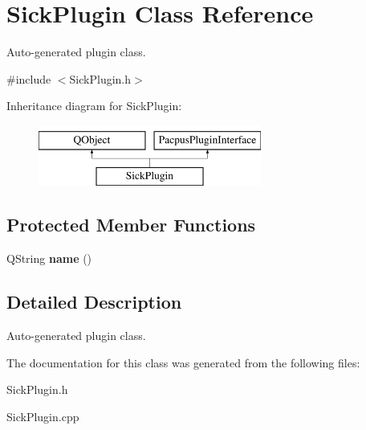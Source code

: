 \hypertarget{classSickPlugin}{\section{Sick\-Plugin Class Reference}
\label{classSickPlugin}
}


Auto-\/generated plugin class.  




{\ttfamily \#include $<$Sick\-Plugin.\-h$>$}

Inheritance diagram for Sick\-Plugin\-:\begin{figure}[H]
\begin{center}
\leavevmode
\includegraphics[height=2.000000cm]{classSickPlugin}
\end{center}
\end{figure}
\subsection*{Protected Member Functions}
\begin{DoxyCompactItemize}
\item 
\hypertarget{classSickPlugin_a8798b88aed6dfed590dda0c96a754dd0}{Q\-String {\bfseries name} ()}\label{classSickPlugin_a8798b88aed6dfed590dda0c96a754dd0}

\end{DoxyCompactItemize}


\subsection{Detailed Description}
Auto-\/generated plugin class. 

The documentation for this class was generated from the following files\-:\begin{DoxyCompactItemize}
\item 
Sick\-Plugin.\-h\item 
Sick\-Plugin.\-cpp\end{DoxyCompactItemize}
